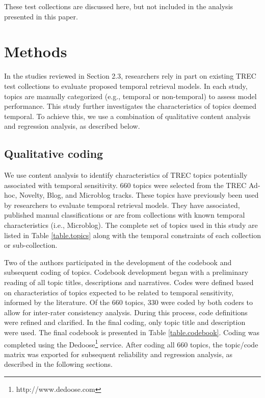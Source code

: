 \documentclass{sig-alternate}
\begin{document}
These test collections are discussed here, but not included in the analysis presented in this paper.


\section{Methods}

In the studies reviewed in Section 2.3, researchers rely in part on existing TREC test collections to evaluate proposed temporal retrieval models. In each study, topics are manually categorized (e.g.,  temporal or non-temporal) to assess model performance. This study further investigates the characteristics of topics deemed temporal. To achieve this, we use a combination of qualitative content analysis and regression analysis, as described below.

\subsection{Qualitative coding}
We use content analysis \cite{Krippendorff1980} to identify characteristics of TREC topics potentially associated with temporal sensitivity. 660 topics were selected from the TREC Ad-hoc, Novelty, Blog, and Microblog tracks. These topics have previously been used by researchers to evaluate temporal retrieval models. They have associated, published manual classifications or are from collections with known temporal characteristics (i.e., Microblog). The complete set of topics used in this study are listed in Table \ref{table.topics} along with the temporal constraints of each collection or sub-collection.



Two of the authors participated in the development of the codebook and subsequent coding of topics. Codebook development began with a preliminary reading of all topic titles, descriptions and narratives. Codes were defined based on characteristics of topics expected to be related to temporal sensitivity, informed by the literature. Of the 660 topics, 330 were coded by both coders to allow for inter-rater consistency analysis. During this process, code definitions were refined and clarified. In the final coding, only topic title and description were used. The final codebook is presented in Table \ref{table.codebook}. Coding was completed using the Dedoose\footnote{http://www.dedoose.com} service.  After coding all 660 topics, the topic/code matrix was exported for subsequent reliability and regression analysis, as described in the following sections. 
\end{document}
